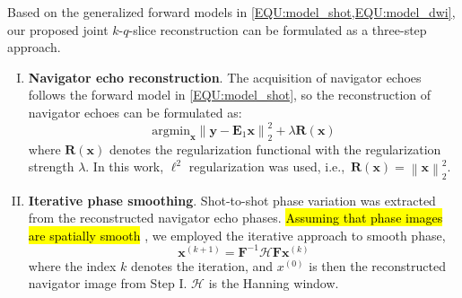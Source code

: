 \documentclass[preprint,12pt,authoryear,review]{elsarticle}
\begin{document}
    Based on the generalized forward models in \cref{EQU:model_shot,EQU:model_dwi},
    our proposed joint $k$-$q$-slice reconstruction can be formulated as a three-step approach.

    \begin{enumerate}[I.]
        \item \textbf{Navigator echo reconstruction}.
        The acquisition of navigator echoes follows the forward model
        in \cref{EQU:model_shot}, so the reconstruction of navigator echoes
        can be formulated as:
        \begin{equation}
            \mathrm{argmin}_\mathbf{x} \left\| \mathbf{y} - \mathbf{E}_1 \mathbf{x} \right\|_2^2
            + \lambda \mathbf{R}(\mathbf{x})
            \label{EQU:solve_navi}
        \end{equation}
    	where $\mathbf{R}(\mathbf{x})$ denotes the regularization functional
    	with the regularization strength $\lambda$.
    	In this work, $\ell^2$ regularization was used,
    	i.e.,~$\mathbf{R}(\mathbf{x}) = \left\lVert \mathbf{x} \right\rVert_2^2$.

        \item \textbf{Iterative phase smoothing}.
        Shot-to-shot phase variation was extracted from
        the reconstructed navigator echo phases.
        \hl{Assuming that phase images are spatially smooth}
        \citep{chen_2013_muse,dai_2023_julep},
        we employed the iterative approach to smooth phase,
        \begin{equation}
        	\mathbf{x}^{(k+1)} = \mathbf{F}^{-1} \mathcal{H} \mathbf{F} \mathbf{x}^{(k)}
        	\label{EQU:ITER_PHASE}
        \end{equation}
    	where the index $k$ denotes the iteration,
    	and $x^{(0)}$ is then the reconstructed navigator image from Step I.
    	$\mathcal{H}$ is the Hanning window.


\end{enumerate}
\end{document}
